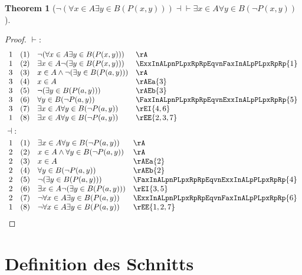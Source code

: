 \documentclass{book}
\theoremstyle{plain}
\newtheorem{theorem}{Theorem}
\theoremstyle{remark}
\theoremstyle{definition}
\begin{document}
\label{nLpFaxInAExyInBLpPLpxwyRpRpRpEqvExxInAFayInBLpnPLpxwyRpRp}
\begin{theorem}[\(\neg(\forall x\in A\exists y\in B(P(x,y))) \dashv\vdash \exists x\in A\forall y\in B(\neg P(x,y))\)]
\end{theorem}
\begin{proof}
	\(\vdash:\)
	\[
	\begin{array}{llll}
		1 & (1) & \neg(\forall x\in A\exists y\in B(P(x,y))) & \rA \\
		1 & (2) & \exists x\in A\neg(\exists y\in B(P(x,y))) & \ExxInALpnPLpxRpRpEqvnFaxInALpPLpxRpRp{1} \\
		3 & (3) & x\in A\land \neg(\exists y\in B(P(a,y))) & \rA \\
        3 & (4) & x\in A & \rAEa{3} \\
        3 & (5) & \neg(\exists y\in B(P(a,y))) & \rAEb{3} \\
        3 & (6) & \forall y\in B(\neg P(a,y)) & \FaxInALpnPLpxRpRpEqvnExxInALpPLpxRpRp{5} \\
		3 & (7) & \exists x\in A\forall y\in B(\neg P(a,y)) & \rEI{4,6} \\
        1 & (8) & \exists x\in A\forall y\in B(\neg P(a,y)) & \rEE{2,3,7} \\
	\end{array}
	\]
	\(\dashv:\)
	\[
	\begin{array}{llll}
		1 & (1) & \exists x\in A\forall y\in B(\neg P(a,y)) & \rA \\
		2 & (2) & x\in A\land \forall y\in B(\neg P(a,y)) & \rA \\
        2 & (3) & x\in A & \rAEa{2} \\
        2 & (4) & \forall y\in B(\neg P(a,y)) & \rAEb{2} \\ 
		2 & (5) & \neg(\exists y\in B(P(a,y))) & \FaxInALpnPLpxRpRpEqvnExxInALpPLpxRpRp{4} \\
		2 & (6) & \exists x\in A\neg(\exists y\in B(P(a,y))) & \rEI{3,5} \\
		2 & (7) & \neg \forall x\in A\exists y\in B(P(a,y)) & \ExxInALpnPLpxRpRpEqvnFaxInALpPLpxRpRp{6} \\
		1 & (8) & \neg \forall x\in A\exists y\in B(P(a,y)) & \rEE{1,2,7} \\
	\end{array}
	\]
\end{proof}


\section{Definition des Schnitts}
\end{document}
